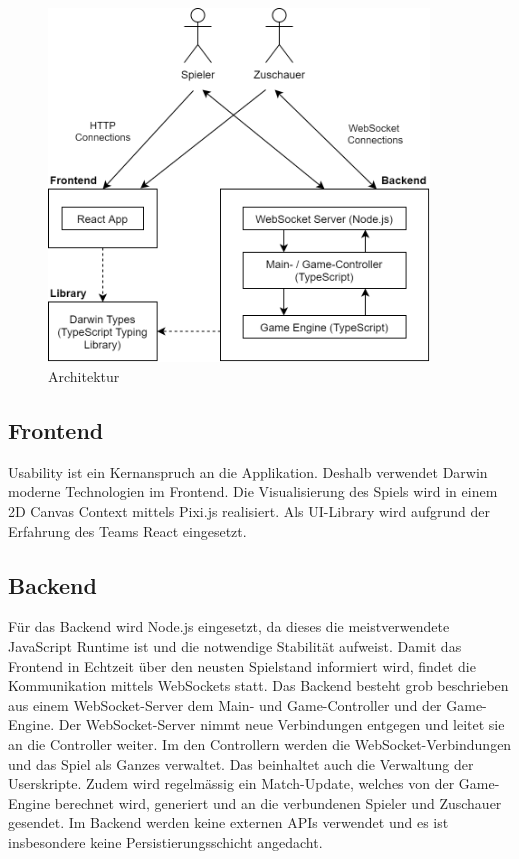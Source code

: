 \documentclass[11pt,a4paper,german]{scrartcl}
\begin{document}
\begin{figure}[h]
  \label{fig:architecture}
  \centering
  \includegraphics[width=0.9\textwidth]{architecture}
  \caption{Architektur}
\end{figure}

\subsection{Frontend}
Usability ist ein Kernanspruch an die Applikation. Deshalb verwendet Darwin moderne Technologien im Frontend.
Die Visualisierung des Spiels wird in einem 2D Canvas Context mittels Pixi.js realisiert.
Als UI-Library wird aufgrund der Erfahrung des Teams React eingesetzt.

\subsection{Backend}
Für das Backend wird Node.js eingesetzt, da dieses die meistverwendete JavaScript Runtime ist und die notwendige Stabilität aufweist.
Damit das Frontend in Echtzeit über den neusten Spielstand informiert wird, findet die Kommunikation mittels WebSockets statt.
Das Backend besteht grob beschrieben aus einem WebSocket-Server dem Main- und Game-Controller und der Game-Engine.
Der WebSocket-Server nimmt neue Verbindungen entgegen und leitet sie an die Controller weiter. Im den Controllern werden die WebSocket-Verbindungen und das Spiel als Ganzes verwaltet. Das beinhaltet auch die Verwaltung der Userskripte.
Zudem wird regelmässig ein Match-Update, welches von der Game-Engine berechnet wird, generiert und an die verbundenen Spieler und Zuschauer gesendet. 
Im Backend werden keine externen APIs verwendet und es ist insbesondere keine Persistierungsschicht angedacht.
\end{document}
